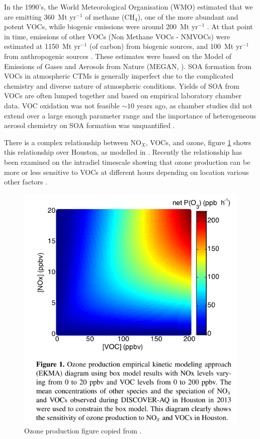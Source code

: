     In the 1990's, the World Meteorological Organisation (WMO) estimated that we are emitting 360~Mt yr$^{-1}$ of methane (CH$_4$), one of the more abundant and potent VOCs, while biogenic emissions were around 200~Mt yr$^{-1}$ \citep{Atkinson2000}.
    At that point in time, emissions of other VOCs (Non Methane VOCs - NMVOCs) were estimated at 1150~Mt yr$^{-1}$ (of carbon) from biogenic sources, and 100~Mt yr$^{-1}$ from anthropogenic sources \citep{Guenther1995, Atkinson2000}.
    These estimates were based on the Model of Emissions of Gases and Aerosols from Nature (MEGAN, \citet{Guenther1995}).
    SOA formation from VOCs in atmospheric CTMs is generally imperfect due to the complicated chemistry and diverse nature of atmospheric conditions.
    Yields of SOA from VOCs are often lumped together and based on empirical laboratory chamber data. 
    VOC oxidation was not feasible $\sim 10$ years ago,  as chamber studies did not extend over a large enough parameter range and the importance of heterogeneous aerosol chemistry on SOA formation was unquantified \citep{Kanakidou2005}.    
    
    There is a complex relationship between NO$_X$, VOCs, and ozone, figure \ref{LR:fig:NOXVOCOzone} shows this relationship over Houston, as modelled in \cite{Mazzuca2016}.
    Recently the relationship has been examined on the intradiel timescale showing that ozone production can be more or less sensitive to VOCs at different hours depending on location various other factors \citep{Mazzuca2016}.
    
    \begin{figure}
      \includegraphics[width=.75\textwidth]{Figures/Mazzuca2016_NOxVOCOzone.png}
      \caption{Ozone production figure copied from \citet{Mazzuca2016}.}
      \label{LR:fig:NOXVOCOzone}
    \end{figure}
  
